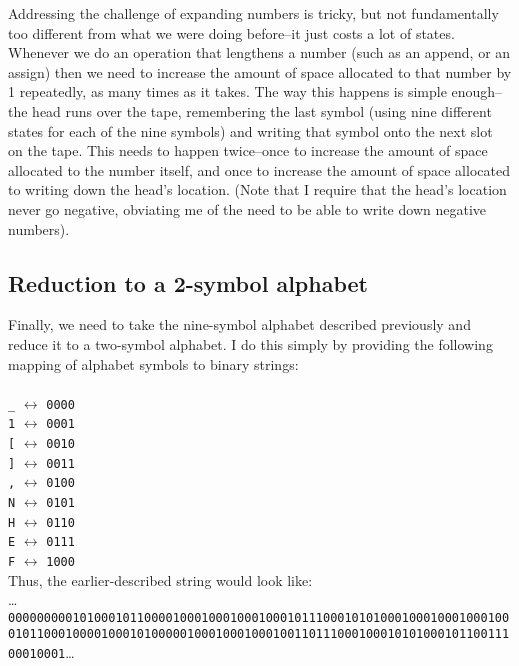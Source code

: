 \documentclass{article}
\begin{document}
Addressing the challenge of expanding numbers is tricky, but not fundamentally too different from what we were doing before--it just costs a lot of states. Whenever we do an operation that lengthens a number (such as an append, or an assign) then we need to increase the amount of space allocated to that number by 1 repeatedly, as many times as it takes. The way this happens is simple enough--the head runs over the tape, remembering the last symbol (using nine different states for each of the nine symbols) and writing that symbol onto the next slot on the tape. This needs to happen twice--once to increase the amount of space allocated to the number itself, and once to increase the amount of space allocated to writing down the head's location. (Note that I require that the head's location never go negative, obviating me of the need to be able to write down negative numbers).

\subsection{Reduction to a 2-symbol alphabet}

Finally, we need to take the nine-symbol alphabet described previously and reduce it to a two-symbol alphabet. I do this simply by providing the following mapping of alphabet symbols to binary strings: \\ \\
\texttt{\_} $\leftrightarrow$ \texttt{0000} \\
\texttt{1} $\leftrightarrow$ \texttt{0001} \\
\texttt{[} $\leftrightarrow$ \texttt{0010} \\
\texttt{]} $\leftrightarrow$ \texttt{0011} \\
\texttt{,} $\leftrightarrow$ \texttt{0100} \\
\texttt{N} $\leftrightarrow$ \texttt{0101} \\
\texttt{H} $\leftrightarrow$ \texttt{0110} \\
\texttt{E} $\leftrightarrow$ \texttt{0111} \\ 
\texttt{F} $\leftrightarrow$ \texttt{1000} \\

Thus, the earlier-described string would look like: \\

\dots\texttt{0000000001010001011000010001000100010001011100010101000100010001000100010110001000010001010000010001000100010011011100010001010100010110011100010001}\dots \\
\end{document}
